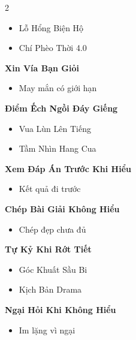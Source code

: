 \begin{multicols}{2}
\begin{itemize}[leftmargin=1.2em, itemsep=0.1em, label=\textcolor{titlecolor}{\tiny$\blacksquare$}]
  \item Lỗ Hổng Biện Hộ
  \item Chí Phèo Thời 4.0
\end{itemize}
\vspace{0.8em}
\textbf{\color{chapterline}Xin Vía Bạn Giỏi}
\begin{itemize}[leftmargin=1.2em, itemsep=0.1em, label=\textcolor{titlecolor}{\tiny$\blacksquare$}]
  \item May mắn có giới hạn
\end{itemize}
\vspace{0.8em}
\textbf{\color{chapterline}Điểm Ếch Ngồi Đáy Giếng}
\begin{itemize}[leftmargin=1.2em, itemsep=0.1em, label=\textcolor{titlecolor}{\tiny$\blacksquare$}]
  \item Vua Lùn Lên Tiếng
  \item Tầm Nhìn Hang Cua
\end{itemize}
\vspace{0.8em}
\textbf{\color{chapterline}Xem Đáp Án Trước Khi Hiểu}
\begin{itemize}[leftmargin=1.2em, itemsep=0.1em, label=\textcolor{titlecolor}{\tiny$\blacksquare$}]
  \item Kết quả đi trước
\end{itemize}
\vspace{0.8em}
\textbf{\color{chapterline}Chép Bài Giải Không Hiểu}
\begin{itemize}[leftmargin=1.2em, itemsep=0.1em, label=\textcolor{titlecolor}{\tiny$\blacksquare$}]
  \item Chép đẹp chưa đủ
\end{itemize}
\vspace{0.8em}
\textbf{\color{chapterline}Tự Kỷ Khi Rớt Tiết}
\begin{itemize}[leftmargin=1.2em, itemsep=0.1em, label=\textcolor{titlecolor}{\tiny$\blacksquare$}]
  \item Góc Khuất Sầu Bi
  \item Kịch Bản Drama
\end{itemize}
\vspace{0.8em}
\textbf{\color{chapterline}Ngại Hỏi Khi Không Hiểu}
\begin{itemize}[leftmargin=1.2em, itemsep=0.1em, label=\textcolor{titlecolor}{\tiny$\blacksquare$}]
  \item Im lặng vì ngại
\end{itemize}

\end{multicols}
